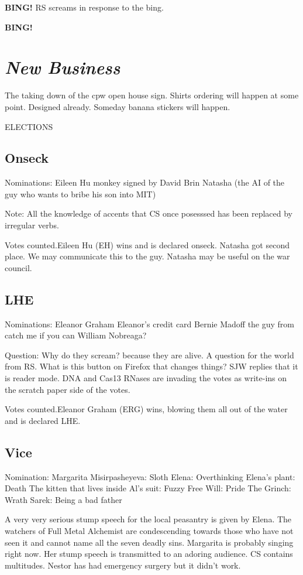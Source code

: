 \documentclass[10pt]{article}
\newcommand{\bing}{{\bf BING!} }
\newcommand{\goto}[1]{\bing \vskip 12pt \section*{{\em{#1}}}}
\begin{document}
\bing
RS screams in response to the bing.

\goto{New Business}
The taking down of the cpw open house sign.
Shirts ordering will happen at some point. Designed already. Someday banana stickers will happen.

ELECTIONS
\subsection*{Onseck}
Nominations:
Eileen Hu
monkey signed by David Brin
\latex
Natasha (the AI of the guy who wants to bribe his son into MIT)

Note: All the knowledge of accents that CS once posesssed has been replaced by irregular verbs.

Votes counted.Eileen Hu (EH)  wins and is declared onseck. Natasha got second place. We may communicate this to the guy. Natasha may be useful on the war council.

\subsection*{LHE}
Nominations:
Eleanor Graham
Eleanor's credit card
Bernie Madoff
the guy from catch me if you can
William Nobreaga?

Question: Why do they scream? because they are alive.
A question for the world from RS. What is this button on Firefox that changes things? SJW replies that it is reader mode.
DNA and Cas13 RNases are invading the votes as write-ins on the scratch paper side of the votes.

Votes counted.Eleanor Graham (ERG) wins, blowing them all out of the water and is declared LHE.

\subsection*{Vice}
Nomination:
Margarita Misirpasheyeva: Sloth
Elena: Overthinking
Elena's plant: Death
The kitten that lives inside Al's suit: Fuzzy
Free Will: Pride
The Grinch: Wrath
Sarek: Being a bad father

A very very serious stump speech for the local peasantry is given by Elena. The watchers of Full Metal Alchemist are condescending towards those who have not seen it and cannot name all the seven deadly sins.
Margarita is probably singing right now. Her stump speech is transmitted to an adoring audience.
CS contains multitudes.
Nestor has had emergency surgery but it didn't work.
\end{document}
